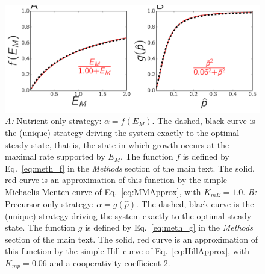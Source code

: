 \begin{figure}[h]
\centering
\includegraphics[width=\textwidth]{./Fig/plot_strategies}
\caption{
\noindent\textit{A:} Nutrient-only strategy: $\alpha = f(E_M)$.
The dashed, black curve is the (unique) strategy driving the system exactly to the optimal steady state, that is, the state in which growth occurs at the maximal rate supported by $E_M$.
The function $f$ is defined by Eq.~\ref{eq:meth_f} in the \textit{Methods} section of the main text.
The solid, red curve is an approximation of this function by the simple Michaelis-Menten curve of Eq.~\ref{eq:MMApprox}, with $K_{mE} = 1.0$.
\textit{B:} Precursor-only strategy: $\alpha = g(\hat{p})$.
The dashed, black curve is the (unique) strategy driving the system exactly to the optimal steady state.
The function $g$ is defined by Eq.~\ref{eq:meth_g} in the \textit{Methods} section of the main text.
The solid, red curve is an approximation of this function by the simple Hill curve of Eq.~\ref{eq:HillApprox}, with $K_{mp} = 0.06$ and a cooperativity coefficient 2.}
\end{figure}